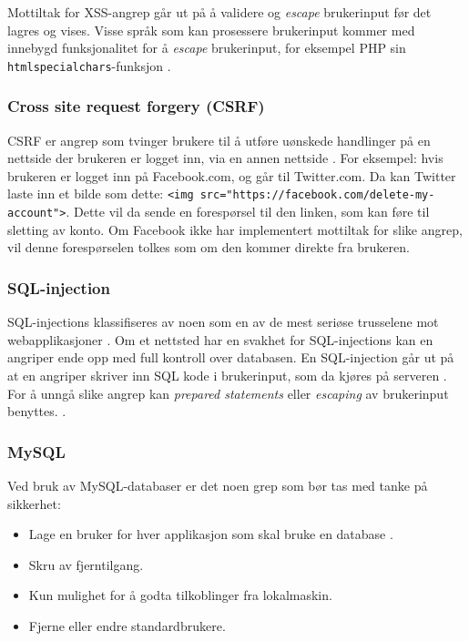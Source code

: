 Mottiltak for XSS-angrep går ut på å validere og \textit{escape} brukerinput før det lagres og vises.
Visse språk som kan prosessere brukerinput kommer med innebygd funksjonalitet for å \textit{escape} brukerinput, for eksempel PHP sin \lstinline{htmlspecialchars}-funksjon \cite{php_htmlspecialchars}.

\subsubsection{Cross site request forgery (CSRF)}
\label{sec:analysis-security-csrf}
CSRF er angrep som tvinger brukere til å utføre uønskede handlinger på en nettside der brukeren er logget inn, via en annen nettside \cite[s.~183-186]{NattTomHeine2015Datasikkerhet}. For eksempel: hvis brukeren er logget inn på Facebook.com, og går til Twitter.com. Da kan Twitter laste inn et bilde som dette: \lstinline{<img src="https://facebook.com/delete-my-account">}. Dette vil da sende en forespørsel til den linken, som kan føre til sletting av konto. Om Facebook ikke har implementert mottiltak for slike angrep, vil denne forespørselen tolkes som om den kommer direkte fra brukeren.

\subsubsection{SQL-injection}
\label{sec:analysis-security-sql-injection}
SQL-injections klassifiseres av noen som en av de mest seriøse trusselene mot webapplikasjoner \cite[s.~1]{halfond2006classification}. Om et nettsted har en svakhet for SQL-injections kan en angriper ende opp med full kontroll over databasen.
En SQL-injection går ut på at en angriper skriver inn SQL kode i brukerinput, som da kjøres på serveren \cite[s.~2]{halfond2006classification}.
For å unngå slike angrep kan \textit{prepared statements} eller \textit{escaping} av brukerinput benyttes. \cite[s.~6]{halfond2006classification}.

\subsubsection{MySQL}
\label{sec:analysis-security-mysql}
Ved bruk av MySQL-databaser er det noen grep som bør tas med tanke 
på sikkerhet:
\begin{itemize}
\item Lage en bruker for hver applikasjon som skal bruke en database \cite{ellingwood_2013}.
\item Skru av fjerntilgang.
\item Kun mulighet for å godta tilkoblinger fra lokalmaskin.
\item Fjerne eller endre standardbrukere.
\end{itemize}


